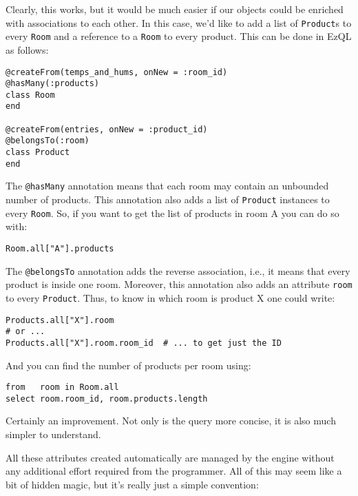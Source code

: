 \documentclass{report}
\begin{document}
Clearly, this works, but it would be much easier if our objects could
be enriched with associations to each other. In this case, we'd like
to add a list of \verb=Product=s to every \verb=Room= and a reference
to a \verb=Room= to every product. This can be done in EzQL as
follows:

\begin{verbatim}
@createFrom(temps_and_hums, onNew = :room_id)
@hasMany(:products)
class Room
end

@createFrom(entries, onNew = :product_id)
@belongsTo(:room)
class Product
end
\end{verbatim}

The \verb=@hasMany= annotation means that each room may contain an
unbounded number of products. This annotation also adds a list of
\verb=Product= instances to every \verb=Room=. So, if you want to get
the list of products in room A you can do so with:

\begin{verbatim}
Room.all["A"].products
\end{verbatim}

The \verb=@belongsTo= annotation adds the reverse association, i.e.,
it means that every product is inside one room. Moreover, this
annotation also adds an attribute \verb=room= to every
\verb=Product=. Thus, to know in which room is product X one could
write:

\begin{verbatim}
Products.all["X"].room
# or ...
Products.all["X"].room.room_id  # ... to get just the ID
\end{verbatim}

And you can find the number of products per room using:

\begin{verbatim}
from   room in Room.all
select room.room_id, room.products.length
\end{verbatim}

Certainly an improvement. Not only is the query more concise, it is
also much simpler to understand.

All these attributes created automatically are managed by the engine
without any additional effort required from the programmer. All of
this may seem like a bit of hidden magic, but it's really just a
simple convention:
\end{document}
